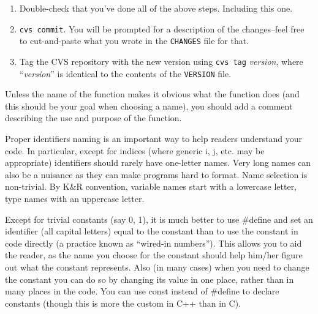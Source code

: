 \documentclass{book}
\begin{document}
\begin{enumerate}
   \item Double-check that you've done all of the above steps.  Including
      this one.

   \item \texttt{cvs commit}.  You will be prompted for a description of the
      changes--feel free to cut-and-paste what you wrote in the
      \texttt{CHANGES} file for that.

   \item Tag the CVS repository with the new version using \texttt{cvs tag} \textit{version}, where ``\textit{version}'' is identical to the contents of the \texttt{VERSION} file.
\end{enumerate}






  Unless the name of the function makes it obvious what the function
  does (and this should be your goal when choosing a name), you should
  add a comment describing the use and purpose of the function.

  Proper identifiers naming is an important way to help readers
  understand your code.  In particular, except for indices (where
  generic i, j, etc. may be appropriate) identifiers should rarely
  have one-letter names.  Very long names can also be a nuisance as
  they can make programs hard to format.  Name selection is
  non-trivial. By K\&R convention, variable names start with a
  lowercase letter, type names with an uppercase letter.

%
Except for trivial constants (say 0, 1), it is much better to use
\#define and set an identifier (all capital letters) equal to the
constant than to use the constant in code directly (a practice known
as “wired-in numbers”).  This allows you to aid the reader, as the
name you choose for the constant should help him/her figure out what
the constant represents. Also (in many cases) when you need to change
the constant you can do so by changing its value in one place, rather
than in many places in the code.  You can use const instead of
\#define to declare constants (though this is more the custom in C++
than in C).
\end{document}
